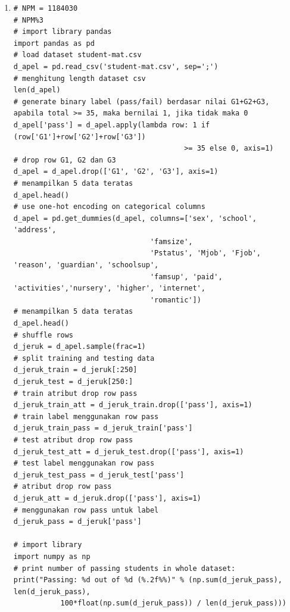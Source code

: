 \begin{enumerate}
\item
\begin{lstlisting}
# NPM = 1184030
# NPM%3
# import library pandas
import pandas as pd
# load dataset student-mat.csv
d_apel = pd.read_csv('student-mat.csv', sep=';')
# menghitung length dataset csv
len(d_apel)
# generate binary label (pass/fail) berdasar nilai G1+G2+G3, apabila total >= 35, maka bernilai 1, jika tidak maka 0
d_apel['pass'] = d_apel.apply(lambda row: 1 if (row['G1']+row['G2']+row['G3']) 
										>= 35 else 0, axis=1)
# drop row G1, G2 dan G3
d_apel = d_apel.drop(['G1', 'G2', 'G3'], axis=1)
# menampilkan 5 data teratas
d_apel.head()
# use one-hot encoding on categorical columns
d_apel = pd.get_dummies(d_apel, columns=['sex', 'school', 'address', 
								'famsize',
								'Pstatus', 'Mjob', 'Fjob', 'reason', 'guardian', 'schoolsup', 
								'famsup', 'paid', 'activities','nursery', 'higher', 'internet',
								'romantic'])
# menampilkan 5 data teratas
d_apel.head()
# shuffle rows
d_jeruk = d_apel.sample(frac=1)
# split training and testing data
d_jeruk_train = d_jeruk[:250]
d_jeruk_test = d_jeruk[250:]
# train atribut drop row pass
d_jeruk_train_att = d_jeruk_train.drop(['pass'], axis=1)
# train label menggunakan row pass
d_jeruk_train_pass = d_jeruk_train['pass']
# test atribut drop row pass
d_jeruk_test_att = d_jeruk_test.drop(['pass'], axis=1)
# test label menggunakan row pass
d_jeruk_test_pass = d_jeruk_test['pass']
# atribut drop row pass
d_jeruk_att = d_jeruk.drop(['pass'], axis=1)
# menggunakan row pass untuk label
d_jeruk_pass = d_jeruk['pass']

# import library
import numpy as np
# print number of passing students in whole dataset:
print("Passing: %d out of %d (%.2f%%)" % (np.sum(d_jeruk_pass), len(d_jeruk_pass), 
	       100*float(np.sum(d_jeruk_pass)) / len(d_jeruk_pass)))


\end{lstlisting}
\end{enumerate}
